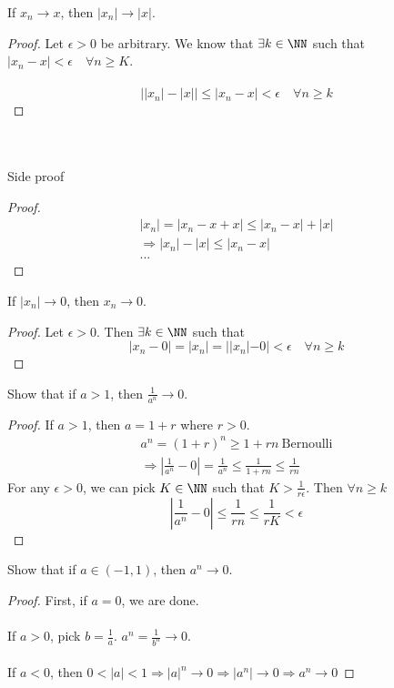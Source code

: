 \documentclass[class=scrartcl, crop=false]{standalone}
\begin{document}
\begin{proposition}
  If $x_n \to x$, then $|x_n| \to |x|$.
  \begin{proof}
    Let $\epsilon > 0$ be arbitrary. We know that $\exists k \in \NN$ such that $|x_n - x| < \epsilon \quad \forall n \geq K$.
    \\\\
    \[
      \left||x_n| - |x|\right| \leq |x_n - x| < \epsilon \quad \forall n \geq k
    \]
  \end{proof} \leavevmode
  \\\\
  Side proof
  \begin{proof}
    \begin{gather*}
      |x_n| = |x_n - x + x| \leq |x_n - x| + |x| \\
      \Rightarrow |x_n| - |x| \leq |x_n - x| \\
      ...
    \end{gather*}
  \end{proof}
\end{proposition}
\begin{proposition}
  If $|x_n| \to 0$, then $x_n \to 0$.
  \begin{proof}
    Let $\epsilon > 0$. Then $\exists k \in \NN$ such that 
    \[
      |x_n - 0| = |x_n| = ||x_n| - 0| < \epsilon \quad \forall n \geq k
    \]
  \end{proof}
\end{proposition}
\begin{exercise}
  Show that if $a > 1$, then $\frac{1}{a^n} \to 0$.
  \begin{proof}
    If $a > 1$, then $a = 1 + r$ where $r > 0$.
    \begin{gather*}
      a^n = (1 + r)^n \geq 1 + rn \ \text{Bernoulli} \\
      \Rightarrow |\frac{1}{a^n} - 0| = \frac{1}{a^n} \leq \frac{1}{1 + rn} \leq \frac{1}{rn}
    \end{gather*}
    For any $\epsilon > 0$, we can pick $K \in \NN$ such that $K > \frac{1}{r\epsilon}$. Then $\forall n \geq k$ 
    \[
      |\frac{1}{a^n} - 0| \leq \frac{1}{rn} \leq \frac{1}{rK} < \epsilon
    \]
  \end{proof}
\end{exercise}
\begin{exercise}
  Show that if $a \in (-1, 1)$, then $a^n \to 0$.
  \begin{proof}
    First, if $a = 0$, we are done.
    \\\\
    If $a > 0$, pick $b = \frac{1}{a}$. $a^n = \frac{1}{b^n} \to 0$.
    \\\\
    If $a < 0$, then $0 < |a| < 1 \Rightarrow |a|^n \to 0 \Rightarrow |a^n| \to 0 \Rightarrow a^n \to 0$
  \end{proof}
\end{exercise}
\end{document}
